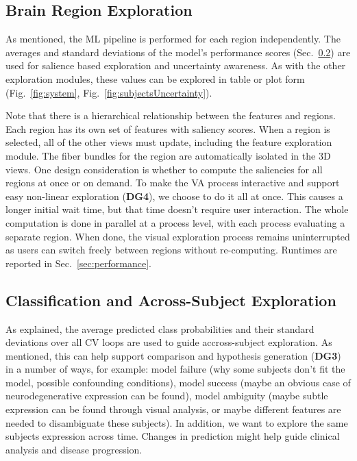 
\subsection{Brain Region Exploration}
\label{sec:aggregation}

\noindent As mentioned, the ML pipeline is performed for each region independently. The averages and standard deviations of the model's performance scores (Sec.~\ref{sec:subjects}) are used for salience based exploration and uncertainty awareness. As with the other exploration modules, these values can be explored in table or plot form (Fig.~\ref{fig:system}, Fig.~\ref{fig:subjectsUncertainty}).

Note that there is a hierarchical relationship between the features and regions. Each region has its own set of features with saliency scores. When a region is selected, all of the other views must update, including the feature exploration module. The fiber bundles for the region are automatically isolated in the 3D views. One design consideration is whether to compute the saliencies for all regions at once or on demand. To make the VA process interactive and support easy non-linear exploration (\textbf{DG4}), we choose to do it all at once. This causes a longer initial wait time, but that time doesn't require user interaction. The whole computation is done in parallel at a process level, with each process evaluating a separate region. When done, the visual exploration process remains uninterrupted as users can switch freely between regions without re-computing. Runtimes are reported in Sec.~\ref{sec:performance}.



\subsection{Classification and Across-Subject Exploration}
\label{sec:subjects}

\noindent As explained, the average predicted class probabilities and their standard deviations over all CV loops are used to guide accross-subject exploration. As mentioned, this can help support comparison and hypothesis generation (\textbf{DG3}) in a number of ways, for example: model failure (why some subjects don't fit the model, possible confounding conditions), model success (maybe an obvious case of neurodegenerative expression can be found), model ambiguity (maybe subtle expression can be found through visual analysis, or maybe different features are needed to disambiguate these subjects). In addition, we want to explore the same subjects expression across time. Changes in prediction might help guide clinical analysis and disease progression. 

